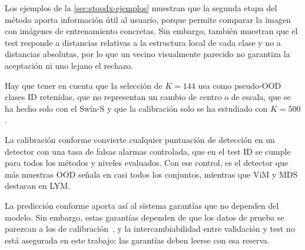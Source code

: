 Los ejemplos de la \cref{sec:stoodx-ejemplos} muestran que la segunda etapa del método aporta información útil al usuario, porque permite comparar la imagen con imágenes de entrenamiento concretas. Sin embargo, también muestran que el test responde a distancias relativas a la estructura local de cada clase y no a distancias absolutas, por lo que un vecino visualmente parecido no garantiza la aceptación ni uno lejano el rechazo.

Hay que tener en cuenta que la selección de $K = 144$ usa como pseudo-OOD clases ID retenidas, que no representan un cambio de centro o de escala, que se ha hecho solo con el Swin-S y que la calibración solo se ha estudiado con $K = 500$.

La calibración conforme convierte cualquier
puntuación de detección en un detector con una tasa de falsas alarmas controlada,
que en el test ID se cumple para todos los métodos y niveles evaluados. Con ese
control, \stoodx es el detector que más muestras OOD señala en casi todos los
conjuntos, mientras que ViM y MDS destacan en LYM.

La predicción conforme aporta así al sistema garantías que no dependen del modelo.
Sin embargo, estas garantías dependen de que los datos de prueba se parezcan a los
de calibración~\cite{angelopoulos2021}, y la intercambiabilidad entre validación y
test no está asegurada en este trabajo: las garantías deben leerse con esa reserva.

\endinput
